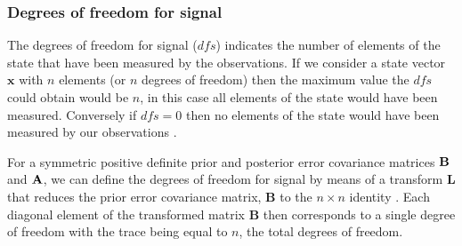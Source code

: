 \documentclass[11pt]{article}
\begin{document}
\subsubsection{Degrees of freedom for signal} \label{DFSintro}%

The degrees of freedom for signal ($dfs$) indicates the number of elements of the state that have been measured by the observations. If we consider a state vector $\textbf{x}$ with $n$ elements (or $n$ degrees of freedom) then the maximum value the $dfs$ could obtain would be $n$, in this case all elements of the state would have been measured. Conversely if $dfs = 0$ then no elements of the state would have been measured by our observations \citep{Fowler2013}.

For a symmetric positive definite prior and posterior error covariance matrices $\bf{B}$ and $\bf{A}$, we can define the degrees of freedom for signal by means of a transform $\textbf{L}$ that reduces the prior error covariance matrix, $\textbf{B}$ to the $n \times n$ identity \citep{fisher2003estimation}. Each diagonal element of the transformed matrix $\textbf{B}$ then corresponds to a single degree of freedom with the trace being equal to $n$, the total degrees of freedom. 
\end{document}
